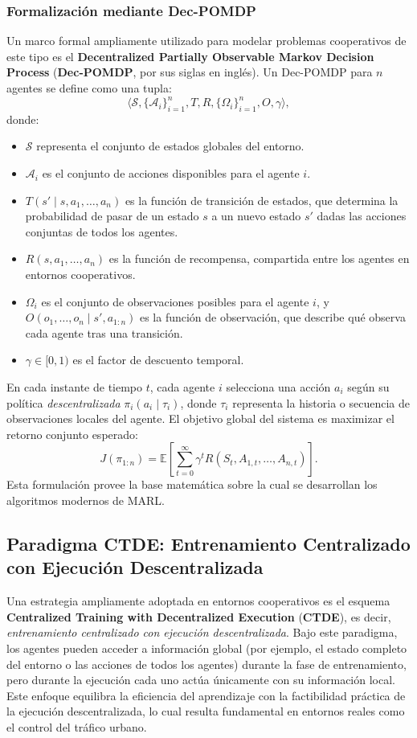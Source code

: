 \subsubsection{Formalización mediante Dec-POMDP}
Un marco formal ampliamente utilizado para modelar problemas cooperativos de este tipo es el \textbf{Decentralized Partially Observable Markov Decision Process} (\textbf{Dec-POMDP}, por sus siglas en inglés).  
Un Dec-POMDP para $n$ agentes se define como una tupla:
\[
\langle \mathcal{S}, \{ \mathcal{A}_i \}_{i=1}^n, T, R, \{ \Omega_i \}_{i=1}^n, O, \gamma \rangle,
\]
donde:
\begin{itemize}
  \item $\mathcal{S}$ representa el conjunto de estados globales del entorno.
  \item $\mathcal{A}_i$ es el conjunto de acciones disponibles para el agente $i$.
  \item $T(s' \mid s, a_1, \dots, a_n)$ es la función de transición de estados, que determina la probabilidad de pasar de un estado $s$ a un nuevo estado $s'$ dadas las acciones conjuntas de todos los agentes.
  \item $R(s, a_1, \dots, a_n)$ es la función de recompensa, compartida entre los agentes en entornos cooperativos.
  \item $\Omega_i$ es el conjunto de observaciones posibles para el agente $i$, y $O(o_1, \dots, o_n \mid s', a_{1:n})$ es la función de observación, que describe qué observa cada agente tras una transición.
  \item $\gamma \in [0,1)$ es el factor de descuento temporal.
\end{itemize}

En cada instante de tiempo $t$, cada agente $i$ selecciona una acción $a_i$ según su política \emph{descentralizada} $\pi_i(a_i \mid \tau_i)$, donde $\tau_i$ representa la historia o secuencia de observaciones locales del agente.  
El objetivo global del sistema es maximizar el retorno conjunto esperado:
\[
J(\pi_{1:n}) = \mathbb{E}\!\left[ \sum_{t=0}^{\infty} \gamma^t R(S_t, A_{1,t}, \dots, A_{n,t}) \right].
\]
Esta formulación provee la base matemática sobre la cual se desarrollan los algoritmos modernos de MARL. \cite{decpomdp-survey,marlbook}

\subsection{Paradigma CTDE: Entrenamiento Centralizado con Ejecución Descentralizada}
Una estrategia ampliamente adoptada en entornos cooperativos es el esquema \textbf{Centralized Training with Decentralized Execution} (\textbf{CTDE}), es decir, \emph{entrenamiento centralizado con ejecución descentralizada}.  
Bajo este paradigma, los agentes pueden acceder a información global (por ejemplo, el estado completo del entorno o las acciones de todos los agentes) durante la fase de entrenamiento, pero durante la ejecución cada uno actúa únicamente con su información local.  
Este enfoque equilibra la eficiencia del aprendizaje con la factibilidad práctica de la ejecución descentralizada, lo cual resulta fundamental en entornos reales como el control del tráfico urbano. \cite{ctde_survey,marlbook}

